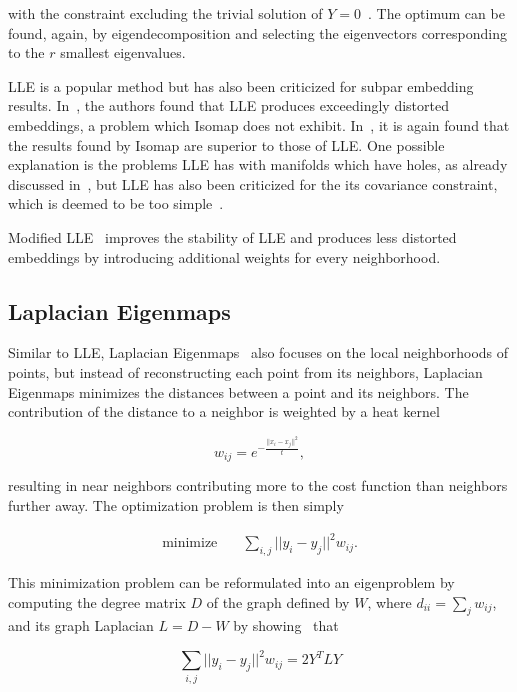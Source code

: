 with the constraint excluding the trivial solution of $Y = 0$~\cite{vandermaaten_review}. The
optimum can be found, again, by eigendecomposition and selecting the eigenvectors corresponding to
the $r$ smallest eigenvalues.

LLE is a popular method but has also been criticized for subpar embedding results. In~\cite{planar_arrangement}, the
authors found that LLE produces exceedingly distorted embeddings, a problem which Isomap does
not exhibit. In~\cite{motion_data}, it is again found that the results found by Isomap
are superior to those of LLE. One possible explanation is the problems LLE has with manifolds
which have holes, as already discussed in~\cite{lle}, but LLE has also been criticized for the
its covariance constraint, which is deemed to be too simple~\cite{vandermaaten_review}.

Modified LLE~\cite{mod_lle} improves the stability of LLE and produces less distorted embeddings
by introducing additional weights for every neighborhood.

\subsection{Laplacian Eigenmaps}

Similar to LLE, Laplacian Eigenmaps~\cite{leigs} also focuses on the local neighborhoods of points, but
instead of reconstructing each point from its neighbors, Laplacian Eigenmaps minimizes the
distances between a point and its neighbors. The contribution of the distance to a neighbor
is weighted by a heat kernel

\begin{equation}
    w_{ij} = e^{-\frac{||x_i - x_j||^2}{t}},
\end{equation}

resulting in near neighbors contributing more to the cost function than neighbors further
away. The optimization problem is then simply

\begin{align}
    \text{minimize} \quad & \sum_{i, j} || y_i - y_j ||^2 w_{ij}.
\end{align}

This minimization problem can be reformulated into an eigenproblem by computing
the degree matrix $D$ of the graph defined by $W$, where $d_{ii} = \sum_j w_{ij}$, and its graph Laplacian $L = D - W$ by
showing~\cite{leigs} that

\begin{equation}
    \sum_{i, j} || y_i - y_j ||^2w_{ij} = 2 Y^TLY
\end{equation}

